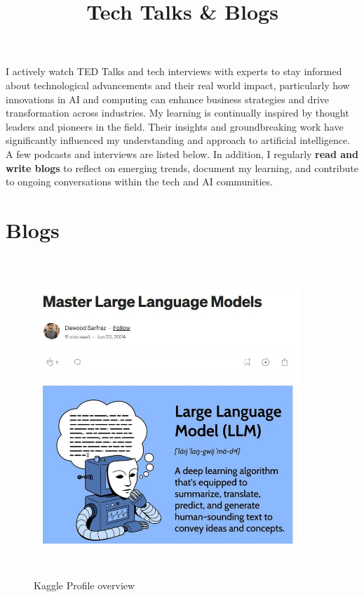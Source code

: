 \documentclass[a4paper,12pt]{article}
\date{}
\title {\textbf{Tech Talks \& Blogs}}
\begin{document}
	\maketitle
	\vspace{-60pt} %
I actively watch TED Talks and tech interviews with experts to stay informed about technological advancements and their real world impact, particularly how innovations in AI and computing can enhance business strategies and drive transformation across industries. My learning is continually inspired by thought leaders and pioneers in the field. Their insights and groundbreaking work have significantly influenced my understanding and approach to artificial intelligence. A few podcasts and interviews are listed below.
\newline
\newline
In addition, I regularly \textbf{read and write blogs} to reflect on emerging trends, document my learning, and contribute to ongoing conversations within the tech and AI communities.
\\
\section*{Blogs}
\vspace{-2pt} %
\begin{figure}[h]
	\centering
	\vspace{-10pt} %
	\includegraphics[width=0.9\textwidth, height=12cm, keepaspectratio]{../Talks Blogs/Master Large Language Models}
	\vspace{-5pt} %
	\caption{Kaggle Profile overview}
	\vspace{-10pt}
\end{figure}
\end{document}
